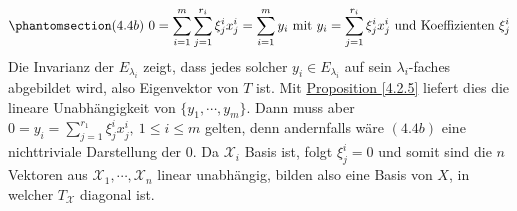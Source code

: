 \begin{itemize}
\[\phantomsection\label{4.4b}(4.4b)\ 0=\sum _{i=1}^m \sum _{j=1}^{r_i}\xi _j^ix_j^i=\sum _{i=1}^m y_i\text{ mit } y_i=\sum _{j=1}^{r_i}\xi _j^i x_j^i\text{ und Koeffizienten }\xi _j^i\]
Die Invarianz der $E_{\lambda _i}$ zeigt, dass jedes solcher $y_i\in E_{\lambda _i}$ auf sein $\lambda _i$-faches abgebildet wird, also Eigenvektor von $T$ ist.  Mit \hyperref[4.2.5]{Proposition \ref{4.2.5}} liefert dies die lineare Unabhängigkeit von $\{y_1,\cdots ,y_m\}$.  Dann muss aber $0=y_i=\sum _{j=1}^{r_1}\xi _j^ix_j^i,\ 1\leq i\leq m$ gelten, denn andernfalls wäre \hyperref[4.4b]{$(4.4b)$} eine nichttriviale Darstellung der $0$.  Da $\mathcal{X}_i$ Basis ist, folgt $\xi _j^i=0$ und somit sind die $n$ Vektoren aus $\mathcal{X}_1,\cdots ,\mathcal{X}_n$ linear unabhängig, bilden also eine Basis von $X$, in welcher $T_\mathcal{X}$ diagonal ist.
\end{itemize}
